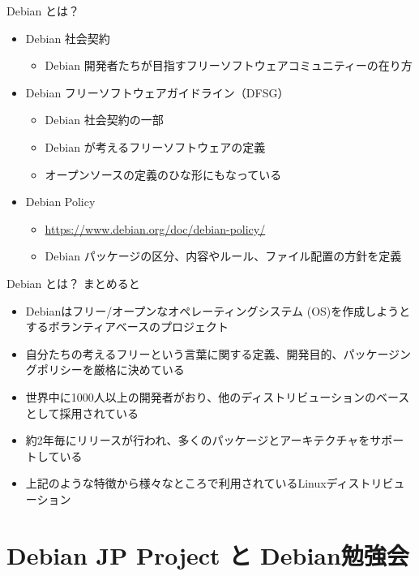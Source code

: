 \begin{frame}{Debian とは？}

\begin{itemize}
  \item Debian 社会契約
    \begin{itemize}
      \item Debian 開発者たちが目指すフリーソフトウェアコミュニティーの在り方
    \end{itemize}
  \item Debian フリーソフトウェアガイドライン（DFSG）
    \begin{itemize}
      \item Debian 社会契約の一部
      \item Debian が考えるフリーソフトウェアの定義
      \item オープンソースの定義のひな形にもなっている
    \end{itemize}
  \item Debian Policy
    \begin{itemize}
      \item \url{https://www.debian.org/doc/debian-policy/}
      \item Debian パッケージの区分、内容やルール、ファイル配置の方針を定義
    \end{itemize}
\end{itemize}

\end{frame}


\begin{frame}{Debian とは？}
まとめると
\begin{itemize}
  \item Debianはフリー/オープンなオペレーティングシステム (OS)を作成しようとするボランティアベースのプロジェクト
  \item 自分たちの考えるフリーという言葉に関する定義、開発目的、パッケージングポリシーを厳格に決めている
  \item 世界中に1000人以上の開発者がおり、他のディストリビューションのベースとして採用されている
  \item 約2年毎にリリースが行われ、多くのパッケージとアーキテクチャをサポートしている
  \item 上記のような特徴から様々なところで利用されているLinuxディストリビューション
\end{itemize}

\end{frame}



\section{Debian JP Project と Debian勉強会}


